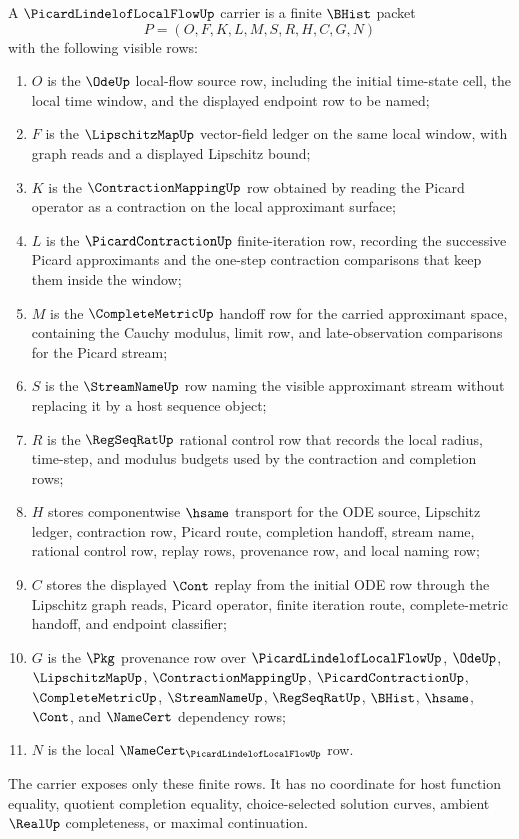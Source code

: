 \begin{definition}
\label{def:picard-lindelof-local-flow-carrier}
A $\PicardLindelofLocalFlowUp$ carrier is a finite $\BHist$ packet
$$
P=(O,F,K,L,M,S,R,H,C,G,N)
$$
with the following visible rows:
\begin{enumerate}
\item $O$ is the $\OdeUp$ local-flow source row, including the initial time-state cell, the local time window, and the displayed endpoint row to be named;
\item $F$ is the $\LipschitzMapUp$ vector-field ledger on the same local window, with graph reads and a displayed Lipschitz bound;
\item $K$ is the $\ContractionMappingUp$ row obtained by reading the Picard operator as a contraction on the local approximant surface;
\item $L$ is the $\PicardContractionUp$ finite-iteration row, recording the successive Picard approximants and the one-step contraction comparisons that keep them inside the window;
\item $M$ is the $\CompleteMetricUp$ handoff row for the carried approximant space, containing the Cauchy modulus, limit row, and late-observation comparisons for the Picard stream;
\item $S$ is the $\StreamNameUp$ row naming the visible approximant stream without replacing it by a host sequence object;
\item $R$ is the $\RegSeqRatUp$ rational control row that records the local radius, time-step, and modulus budgets used by the contraction and completion rows;
\item $H$ stores componentwise $\hsame$ transport for the ODE source, Lipschitz ledger, contraction row, Picard route, completion handoff, stream name, rational control row, replay rows, provenance row, and local naming row;
\item $C$ stores the displayed $\Cont$ replay from the initial ODE row through the Lipschitz graph reads, Picard operator, finite iteration route, complete-metric handoff, and endpoint classifier;
\item $G$ is the $\Pkg$ provenance row over $\PicardLindelofLocalFlowUp$, $\OdeUp$, $\LipschitzMapUp$, $\ContractionMappingUp$, $\PicardContractionUp$, $\CompleteMetricUp$, $\StreamNameUp$, $\RegSeqRatUp$, $\BHist$, $\hsame$, $\Cont$, and $\NameCert$ dependency rows;
\item $N$ is the local $\NameCert_{\PicardLindelofLocalFlowUp}$ row.
\end{enumerate}
The carrier exposes only these finite rows. It has no coordinate for host function equality, quotient completion equality, choice-selected solution curves, ambient $\RealUp$ completeness, or maximal continuation.
\end{definition}

